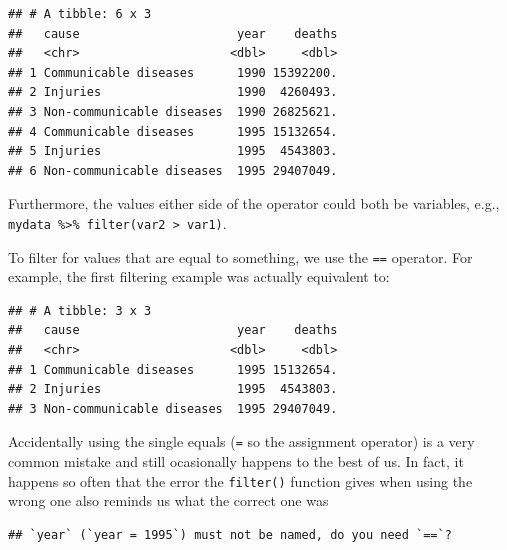 \documentclass[12pt,]{krantz}
\makeatletter
\newenvironment{Shaded}{\begin{snugshade}}{\end{snugshade}}
\newcommand{\DataTypeTok}[1]{\textcolor[rgb]{0.13,0.29,0.53}{#1}}
\newcommand{\DecValTok}[1]{\textcolor[rgb]{0.00,0.00,0.81}{#1}}
\newcommand{\KeywordTok}[1]{\textcolor[rgb]{0.13,0.29,0.53}{\textbf{#1}}}
\newcommand{\NormalTok}[1]{#1}
\newcommand{\OperatorTok}[1]{\textcolor[rgb]{0.81,0.36,0.00}{\textbf{#1}}}
\newcommand{\StringTok}[1]{\textcolor[rgb]{0.31,0.60,0.02}{#1}}
\newenvironment{kframe}{%
\medskip{}
\setlength{\fboxsep}{.8em}
 \def\at@end@of@kframe{}%
 \ifinner\ifhmode%
  \def\at@end@of@kframe{\end{minipage}}%
  \begin{minipage}{\columnwidth}%
 \fi\fi%
 \def\FrameCommand##1{\hskip\@totalleftmargin \hskip-\fboxsep
 \colorbox{shadecolor}{##1}\hskip-\fboxsep
     \hskip-\linewidth \hskip-\@totalleftmargin \hskip\columnwidth}%
 \MakeFramed {\advance\hsize-\width
   \@totalleftmargin\z@ \linewidth\hsize
   \@setminipage}}%
 {\par\unskip\endMakeFramed%
 \at@end@of@kframe}
\renewenvironment{Shaded}{\begin{kframe}}{\end{kframe}}
\theoremstyle{definition}
\theoremstyle{definition}
\theoremstyle{definition}
\theoremstyle{remark}
\makeatother
\begin{document}
\begin{verbatim}
## # A tibble: 6 x 3
##   cause                      year    deaths
##   <chr>                     <dbl>     <dbl>
## 1 Communicable diseases      1990 15392200.
## 2 Injuries                   1990  4260493.
## 3 Non-communicable diseases  1990 26825621.
## 4 Communicable diseases      1995 15132654.
## 5 Injuries                   1995  4543803.
## 6 Non-communicable diseases  1995 29407049.
\end{verbatim}

Furthermore, the values either side of the operator could both be
variables, e.g.,
\texttt{mydata\ \%\textgreater{}\%\ filter(var2\ \textgreater{}\ var1)}.

To filter for values that are equal to something, we use the \texttt{==}
operator. For example, the first filtering example was actually
equivalent to:

\begin{Shaded}
\end{Shaded}

\begin{verbatim}
## # A tibble: 3 x 3
##   cause                      year    deaths
##   <chr>                     <dbl>     <dbl>
## 1 Communicable diseases      1995 15132654.
## 2 Injuries                   1995  4543803.
## 3 Non-communicable diseases  1995 29407049.
\end{verbatim}

Accidentally using the single equals (\texttt{=} so the assignment
operator) is a very common mistake and still ocasionally happens to the
best of us. In fact, it happens so often that the error the
\texttt{filter()} function gives when using the wrong one also reminds
us what the correct one was

\begin{Shaded}
\end{Shaded}

\begin{verbatim}
## `year` (`year = 1995`) must not be named, do you need `==`?
\end{verbatim}
\end{document}
